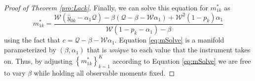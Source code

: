 \begin{proof}[Proof of Theorem \ref{pro:Lack}]
Finally, we can solve this equation for $m^*_{1k}$ as
\begin{equation}
  m^*_{1k} = \frac{\mathcal{W}(\hat{y}_{0k}-\alpha_1 \mathcal{Q}) - \beta(\mathcal{Q}-\beta-\mathcal{W}\alpha_1) + \mathcal{W}^2(1-p_k)\alpha_1}{\mathcal{W}(1-p_k - \alpha_1) - \beta}
  \label{eq:mSolve}
\end{equation}
using the fact that $c = \mathcal{Q} - \beta - \mathcal{W}\alpha_1$.
Equation \ref{eq:mSolve} is a manifold parameterized by $(\beta,\alpha_1)$ that is \emph{unique} to each value that the instrument takes on. 
Thus, by adjusting $\left\{ m^*_{1k} \right\}_{k=1}^K$ according to Equation \ref{eq:mSolve} we are free to vary $\beta$ while holding all observable moments fixed. 
\end{proof}



